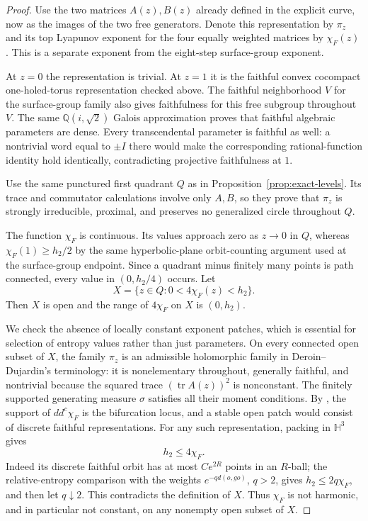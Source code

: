 \documentclass[11pt,letterpaper]{amsart}
\theoremstyle{definition}
\theoremstyle{remark}
\numberwithin{equation}{section}
\begin{document}
\begin{proof}
Use the two matrices $A(z),B(z)$ already defined in the explicit curve,
now as the images of the two free generators.  Denote this representation
by $\pi_z$ and its top Lyapunov exponent for the four equally weighted
matrices by $\chi_F(z)$.  This is a separate exponent from the eight-step
surface-group exponent.

At $z=0$ the representation is trivial.  At $z=1$ it is the faithful
convex cocompact one-holed-torus representation checked above.
The faithful neighborhood $V$ for the surface-group family also gives
faithfulness for this free subgroup throughout $V$.  The same
$\mathbb Q(i,\sqrt2)$ Galois approximation proves that faithful
algebraic parameters are dense.  Every transcendental parameter is
faithful as well: a nontrivial word equal to $\pm I$ there would make
the corresponding rational-function identity hold identically,
contradicting projective faithfulness at $1$.

Use the same punctured first quadrant $Q$ as in
Proposition~\ref{prop:exact-levels}. Its trace and commutator calculations
involve only $A,B$, so they prove that $\pi_z$ is strongly irreducible,
proximal, and preserves no generalized circle throughout $Q$.

The function $\chi_F$ is continuous.  Its values approach zero as
$z\to0$ in $Q$, whereas $\chi_F(1)\ge h_2/2$ by the same
hyperbolic-plane orbit-counting argument used at the surface-group
endpoint.  Since a quadrant minus finitely many points is path
connected, every value in $(0,h_2/4)$ occurs.  Let
\[
 X=\{z\in Q:0<4\chi_F(z)<h_2\}.
\]
Then $X$ is open and the range of $4\chi_F$ on $X$ is $(0,h_2)$.

We check the absence of locally constant exponent patches, which is
essential for selection of entropy values rather than just parameters.
On every connected open subset of $X$, the family $\pi_z$ is an
admissible holomorphic family in Deroin--Dujardin's terminology: it
is nonelementary throughout, generally faithful, and nontrivial
because the squared trace $(\operatorname{tr}A(z))^2$ is nonconstant.  The finitely
supported generating measure $\sigma$ satisfies all their moment
conditions.  By \cite[Theorems 2.6 and 3.9]{DD}, the support of
$dd^c\chi_F$ is the bifurcation locus, and a stable open patch would
consist of discrete faithful representations.  For any such
representation, packing in $\mathbb H^3$ gives
\[
 h_2\le 4\chi_F.
\]
Indeed its discrete faithful orbit has at most $Ce^{2R}$ points in
an $R$-ball; the relative-entropy comparison with the weights
$e^{-q d(o,go)}$, $q>2$, gives $h_2\le2q\chi_F$, and then let
$q\downarrow2$.  This contradicts the definition of $X$.
Thus $\chi_F$ is not harmonic, and in particular not constant, on
any nonempty open subset of $X$.


\end{proof}
\end{document}
